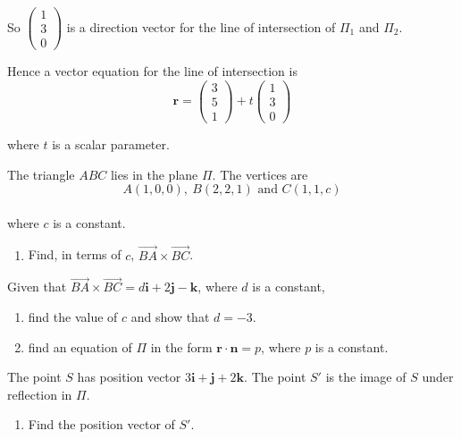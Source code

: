 \documentclass[leqno]{article}
\begin{document}
\begin{enumerate}[
  label=\textbf{\arabic*.},
  leftmargin=*,
  topsep=0pt,
  partopsep=0pt,
  parsep=0pt
]
\begin{djsSolution}
\begin{enumerate}[label=\textbf{(\alph*)}]
So $\begin{pmatrix}1\\3\\0\end{pmatrix}$ is a direction vector for the line of intersection of $\Pi_1$ and $\Pi_2$.

Hence a vector equation for the line of intersection is
\[
\mathbf r=
\begin{pmatrix}3\\5\\1\end{pmatrix}
+t\begin{pmatrix}1\\3\\0\end{pmatrix}
\]

where $t$ is a scalar parameter.
\end{enumerate}
\end{djsSolution}


\newpage

\questionitem

The triangle $ABC$ lies in the plane $\Pi$. The vertices are
\[
A(1,0,0),\ B(2,2,1) \text{ and } C(1,1,c)
\] \\
where $c$ is a constant. \\
\begin{enumerate}[label=\textbf{(\alph*)}]
  \item Find, in terms of $c$, $\overrightarrow{BA}\times\overrightarrow{BC}$.  \\
\end{enumerate}
Given that $\overrightarrow{BA}\times\overrightarrow{BC}=d\mathbf{i}+2\mathbf{j}-\mathbf{k}$, where $d$ is a constant, \\
\begin{enumerate}[label=\textbf{(\alph*)}, resume]
  \item find the value of $c$ and show that $d=-3$.  \\
  \item find an equation of $\Pi$ in the form $\mathbf{r}\cdot\mathbf{n}=p$, where $p$ is a constant.  \\
\end{enumerate}
The point $S$ has position vector $3\mathbf{i}+\mathbf{j}+2\mathbf{k}$. The point $S'$ is the image of $S$ under reflection in $\Pi$. \\
\begin{enumerate}[label=\textbf{(\alph*)}, resume]
  \item Find the position vector of $S'$.  \\
\end{enumerate}


\end{enumerate}
\end{document}

